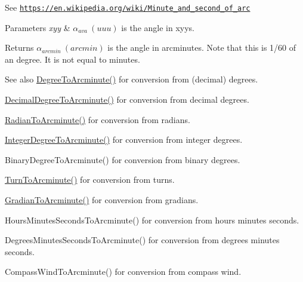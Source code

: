 See \href{https://en.wikipedia.org/wiki/Minute_and_second_of_arc}{\tt https\+://en.\+wikipedia.\+org/wiki/\+Minute\+\_\+and\+\_\+second\+\_\+of\+\_\+arc} 
\begin{DoxyParams}{Parameters}
{\em xyy} & $\alpha_{ava}\ (uuu)$ is the angle in xyys. \\
\hline
\end{DoxyParams}
\begin{DoxyReturn}{Returns}
$\alpha_{arcmin}\ (arcmin)$ is the angle in arcminutes. Note that this is 1/60 of an degree. It is not equal to minutes. 
\end{DoxyReturn}
\begin{DoxySeeAlso}{See also}
\mbox{\hyperlink{group___e_g_x_math-_angle_conversions-_degree_ga8abf327dc5f52907b2c881999e9cc43e}{Degree\+To\+Arcminute()}} for conversion from (decimal) degrees. 

\mbox{\hyperlink{group___e_g_x_math-_angle_conversions-_decimal_degree_ga6b6ea6e45d2a13f556824ca419cc9fbd}{Decimal\+Degree\+To\+Arcminute()}} for conversion from decimal degrees. 

\mbox{\hyperlink{group___e_g_x_math-_angle_conversions-_radian_ga722e3b8e78540a6b3942b73b64aeb8d2}{Radian\+To\+Arcminute()}} for conversion from radians. 

\mbox{\hyperlink{group___e_g_x_math-_angle_conversions-_integer_degree_ga78b014e7649d666a3647c467e64e4fe8}{Integer\+Degree\+To\+Arcminute()}} for conversion from integer degrees. 

Binary\+Degree\+To\+Arcminute() for conversion from binary degrees. 

\mbox{\hyperlink{group___e_g_x_math-_angle_conversions-_turn_ga72cda928d9043c7d82097b1a7920769e}{Turn\+To\+Arcminute()}} for conversion from turns. 

\mbox{\hyperlink{group___e_g_x_math-_angle_conversions-_gradian_ga67ef7daad49b0d73c39c52d426ab46a5}{Gradian\+To\+Arcminute()}} for conversion from gradians. 

Hours\+Minutes\+Seconds\+To\+Arcminute() for conversion from hours minutes seconds. 

Degrees\+Minutes\+Seconds\+To\+Arcminute() for conversion from degrees minutes seconds. 

Compass\+Wind\+To\+Arcminute() for conversion from compass wind. 
\end{DoxySeeAlso}
\mbox{\label{group___e_g_x_math-_angle_conversions-_x_z_x_gaebb234b957f08dcd4f84726bcd3cdf62}} 
